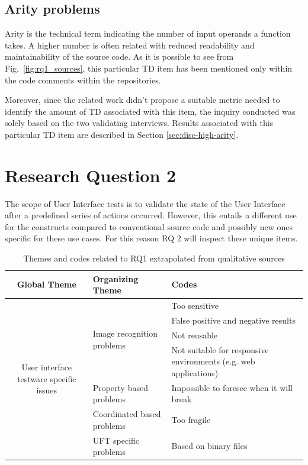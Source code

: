\subsection{Arity problems}
Arity is the technical term indicating the number of input operands a function takes. A higher number is often related with reduced readability and maintainability of the source code. As it is possible to see from Fig.\ \ref{fig:rq1_sources}, this particular TD item has been mentioned only within the code comments within the repositories.

Moreover, since the related work didn't propose a suitable metric needed to identify the amount of TD associated with this item, the inquiry conducted was solely based on the two validating interviews. Results associated with this particular TD item are described in Section \ref{sec:disc-high-arity}.


\FloatBarrier

\section{Research Question 2}
%
The scope of User Interface tests is to validate the state of the User Interface after a predefined series of actions occurred. However, this entails a different use for the constructs compared to conventional source code and possibly new ones specific for these use cases. For this reason RQ 2 will inspect these unique items.



\begin{table}
\renewcommand{\arraystretch}{1.5}
\centering
\begin{tabular}{ c p{4.3cm} p{4.6cm}}

    \hline
    {\large Global Theme} & {\large Organizing Theme} & {\large Codes}\\
    \hline

    \multirow{7}{*}{\parbox[b]{4.3cm}{
        User interface testware specific issues
    }
    } & \multirow{4}{*}{\parbox[c]{4.3cm}{Image recognition problems}}
        & Too sensitive \\
        & & False positive and negative results\\
        & & Not reusable\\
        & & Not suitable for responsive environments (e.g. web applications)\\ \cline{2-3}

    & Property based problems & Impossible to foresee when it will break\\ \cline{2-3}

    & Coordinated based problems  & Too fragile\\ \cline{2-3}

    & UFT specific problems & Based on binary files\\

    \hline
\end{tabular}
\caption{Themes and codes related to RQ1 extrapolated from qualitative sources}
\label{tab:themes_rq2}
\end{table}

